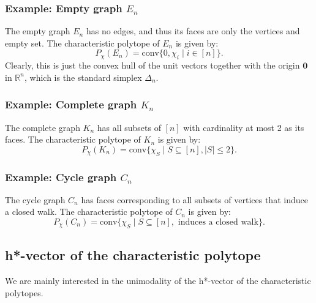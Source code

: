 \documentclass[12pt]{article}
\theoremstyle{definition}
\numberwithin{equation}{subsection}
\begin{document}
\subsubsection{Example: Empty graph $E_n$}
The empty graph $E_n$ has no edges, and thus its faces are only the vertices and empty set. The characteristic polytope of $E_n$ is given by:
\[P_{\chi}(E_n) = \text{conv} \{0, \chi_i \mid i \in [n]\}.\]
Clearly, this is just the convex hull of the unit vectors together with the origin $\textbf{0}$ in $\mathbb{R}^n$, which is the standard simplex $\Delta_{n}$.

\subsubsection{Example: Complete graph $K_n$}
The complete graph $K_n$ has all subsets of $[n]$ with cardinality at most 2 as its faces. The characteristic polytope of $K_n$ is given by:
\[P_{\chi}(K_n) = \text{conv} \{\chi_S \mid S \subseteq [n], |S| \le 2 \}.\]

\subsubsection{Example: Cycle graph $C_n$}
The cycle graph $C_n$ has faces corresponding to all subsets of vertices that induce a closed walk. The characteristic polytope of $C_n$ is given by:
\[P_{\chi}(C_n) = \text{conv} \{\chi_S \mid S \subseteq [n], \text{ induces a closed walk}\}.\]

\subsection{h*-vector of the characteristic polytope}
We are mainly interested in the unimodality of the h*-vector of the characteristic polytopes. 
\end{document}
